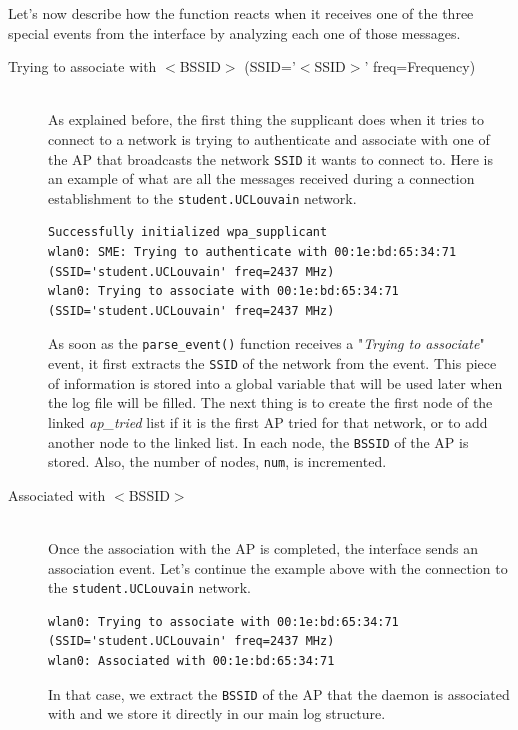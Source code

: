 Let's now describe how the function reacts when it receives one of the three special events from the interface by analyzing each one of those messages.

\begin{description}
	\item[Trying to associate with $<$BSSID$>$ (SSID='$<$SSID$>$' freq=Frequency)]\hfill \\
		As explained before, the first thing the supplicant does when it tries to connect to a network is trying to authenticate and associate with one of the AP that broadcasts the network \texttt{SSID} it wants to connect to. Here is an example of what are all the messages received during a connection establishment to the \texttt{student.UCLouvain} network.\\

\begin{lstlisting}[frame=single,breaklines=true,caption={Example of a trying to authenticate and associate with an AP}]
Successfully initialized wpa_supplicant
wlan0: SME: Trying to authenticate with 00:1e:bd:65:34:71 (SSID='student.UCLouvain' freq=2437 MHz)
wlan0: Trying to associate with 00:1e:bd:65:34:71 (SSID='student.UCLouvain' freq=2437 MHz)
\end{lstlisting}

	As soon as the \texttt{parse\_event()} function receives a "\textit{Trying to associate}" event, it first extracts the \texttt{SSID} of the network from the event. This piece of information is stored into a global variable that will be used later when the log file will be filled. The next thing is to create the first node of the linked \textit{ap\_tried} list if it is the first AP tried for that network, or to add another node to the linked list. In each node, the \texttt{BSSID} of the AP is stored. Also, the number of nodes, \texttt{num}, is incremented.

	\item[Associated with $<$BSSID$>$]\hfill \\
	Once the association with the AP is completed, the interface sends an association event. Let's continue the example above with the connection to the \texttt{student.UCLouvain} network.\\

\begin{lstlisting}[frame=single,breaklines=true,caption={Example of a association with an AP}]
wlan0: Trying to associate with 00:1e:bd:65:34:71 (SSID='student.UCLouvain' freq=2437 MHz)
wlan0: Associated with 00:1e:bd:65:34:71
\end{lstlisting}
In that case, we extract the \texttt{BSSID} of the AP that the daemon is associated with and we store it directly in our main log structure.


\end{description}
